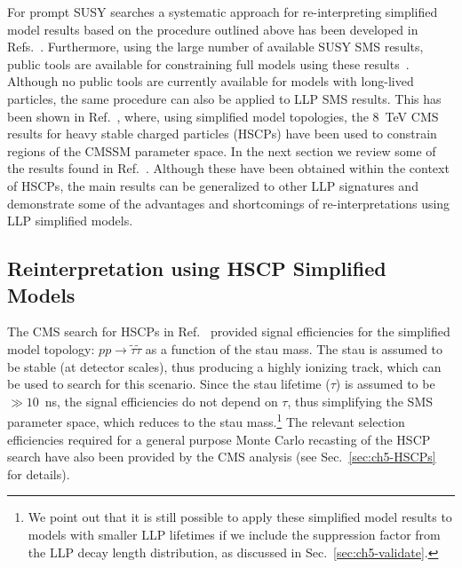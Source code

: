 For prompt SUSY searches a systematic approach for
re-interpreting simplified model results based on the procedure
outlined above has been developed in Refs.~\cite{Kraml:2013mwa,Papucci:2014rja}.
Furthermore, using the large number of available SUSY SMS results, 
public tools are available for constraining full models using these
results~\cite{Papucci:2014rja,Ambrogi:2017neo}.
Although no public tools are currently available for models with long-lived
particles, the same procedure can also be applied to LLP SMS results. This has
been shown in Ref.~\cite{Heisig:2015yla}, where,
using simplified model topologies, the 8~TeV CMS results for heavy
stable charged particles (HSCPs) have been used
to constrain regions of the CMSSM parameter space.
In the next section we review some of the results found in
Ref.~\cite{Heisig:2015yla}. Although these have been obtained within the
context of HSCPs, the main results can be generalized to other LLP
signatures and demonstrate some of the advantages and shortcomings of
re-interpretations using LLP simplified models.


\subsection{Reinterpretation using HSCP Simplified Models}
\label{sec:ch5-smsHSCP}

The CMS search for HSCPs in Ref.~\cite{Khachatryan:2015lla}
provided signal efficiencies for the simplified model topology:
$ pp \to \tilde{\tau} \tilde{\tau}$ as a function of the
stau mass. The stau is assumed to be stable (at detector scales), thus
producing a highly ionizing track, which can be used to search
for this scenario. Since the stau lifetime ($\tau$) is assumed to be $\gg
10$~ns, the signal efficiencies do not depend on $\tau$,
thus simplifying the SMS parameter space, which reduces to the stau
mass.\footnote{We point out that it is still possible to apply these simplified
model results to models with smaller LLP lifetimes if we include the suppression
factor from the LLP decay length distribution, as
discussed in Sec.~\ref{sec:ch5-validate}.
}
The relevant selection efficiencies required for a general purpose
Monte Carlo recasting of the HSCP search have also been provided by
the CMS analysis (see Sec.~\ref{sec:ch5-HSCPs} for details).


